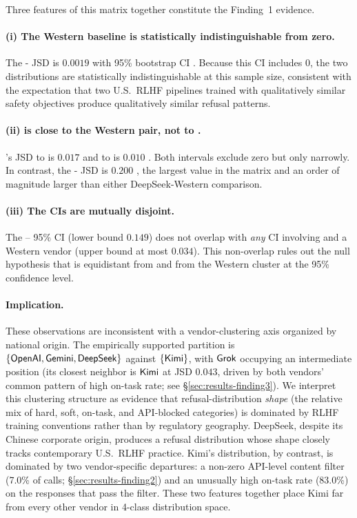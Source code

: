 Three features of this matrix together constitute the Finding~1 evidence.

\paragraph{(i) The Western baseline is statistically indistinguishable from zero.}
The - JSD is $0.0019$ with 95\% bootstrap CI
. Because this CI includes 0, the two distributions
are statistically indistinguishable at this sample size, consistent with
the expectation that two U.S.\ RLHF pipelines trained with qualitatively
similar safety objectives produce qualitatively similar refusal patterns.

\paragraph{(ii)  is close to the Western pair, not to .}
's JSD to  is $0.017$ 
and to  is $0.010$ . Both intervals
exclude zero but only narrowly. In contrast, the
- JSD is $0.200$ , the
largest value in the matrix and an order of magnitude larger than
either DeepSeek-Western comparison.

\paragraph{(iii) The CIs are mutually disjoint.}
The -- 95\% CI (lower bound $0.149$) does not
overlap with \emph{any} CI involving  and a Western vendor
(upper bound at most $0.034$). This non-overlap rules out the null
hypothesis that  is equidistant from  and
from the Western cluster at the 95\% confidence level.

\paragraph{Implication.}
These observations are inconsistent with a vendor-clustering axis organized
by national origin. The empirically supported partition is
$\{\textsf{OpenAI},\textsf{Gemini},\textsf{DeepSeek}\}$ against
$\{\textsf{Kimi}\}$, with $\textsf{Grok}$ occupying an intermediate position
(its closest neighbor is $\textsf{Kimi}$ at JSD $0.043$, driven by both
vendors' common pattern of high on-task rate; see §\ref{sec:results-finding3}).
We interpret this clustering structure as evidence that refusal-distribution
\emph{shape} (the relative mix of hard, soft, on-task, and API-blocked
categories) is dominated by RLHF training conventions rather than by
regulatory geography. DeepSeek, despite its Chinese corporate origin,
produces a refusal distribution whose shape closely tracks
contemporary U.S.\ RLHF practice. Kimi's distribution, by contrast, is
dominated by two vendor-specific departures: a non-zero API-level
content filter (7.0\% of calls; §\ref{sec:results-finding2}) and an
unusually high on-task rate (83.0\%) on the responses that pass the
filter. These two features together place Kimi far from every other
vendor in 4-class distribution space.

